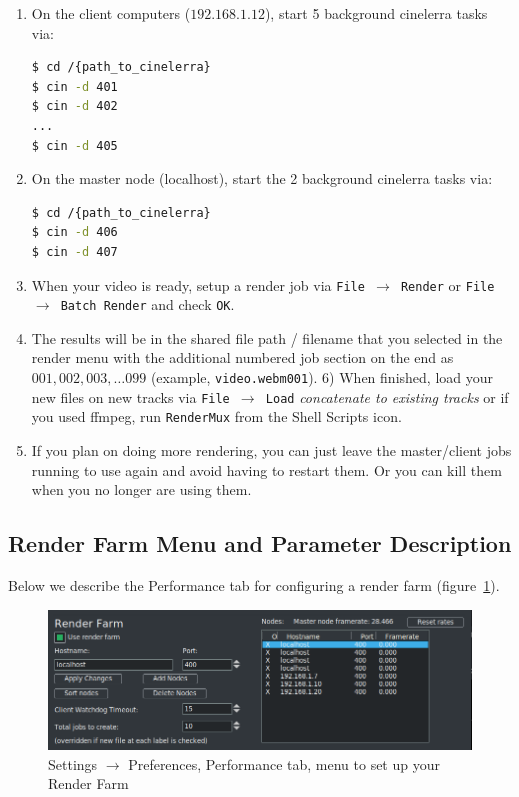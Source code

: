 \begin{enumerate}
    \item On the client computers ($192.168.1.12$), start 5 background cinelerra tasks via:
    \begin{lstlisting}[language=bash,numbers=none]
$ cd /{path_to_cinelerra}
$ cin -d 401
$ cin -d 402 
...
$ cin -d 405
    \end{lstlisting}
    \item On the master node (localhost), start the 2 background cinelerra tasks via:
    \begin{lstlisting}[language=bash,numbers=none]
$ cd /{path_to_cinelerra}
$ cin -d 406
$ cin -d 407
    \end{lstlisting}
    \item When your video is ready, setup a render job via \texttt{File $\rightarrow$  Render} or \texttt{File $\rightarrow$  Batch Render} and check \texttt{OK}.
    \item The results will be in the shared file path / filename that you selected in the render menu with the
    additional numbered job section on the end as  $001, 002, 003, \dots 099$ (example, \texttt{video.webm001}).
    6) When finished, load your new files on new tracks via  \texttt{File  $\rightarrow$ Load} \textit{concatenate to existing tracks}  or if you used ffmpeg, run \texttt{RenderMux} from the Shell Scripts icon.
    \item If you plan on doing more rendering, you can just leave the master/client jobs running to use again
    and avoid having to restart them.  Or you can kill them when you no longer are using them.
\end{enumerate}

\subsection{Render Farm Menu and Parameter Description}%
\label{sub:render_farm_parameter_description}

Below we describe the Performance tab for configuring a render farm (figure~\ref{fig:farm}).

\begin{figure}[htpb]
    \centering
    \includegraphics[width=0.8\linewidth]{images/farm.png}
    \caption{Settings $\rightarrow$ Preferences, Performance tab, menu to set up your Render Farm}
    \label{fig:farm}
\end{figure}

